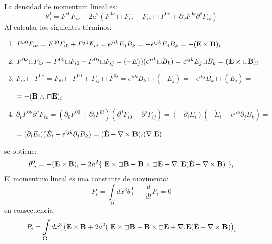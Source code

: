 \documentclass[a4paper,12pt]{article}
\begin{document}
La densidad de momentum lineal es:
\begin{equation}
\theta^0_{\ i}=F^{\nu0}F_{i\nu}-2a^2(F^{0\nu}\Box F_{i\nu}+F_{i\nu}\Box F^{0\nu}+\partial_\nu F^{0\nu}\partial^\rho F_{i\rho})
\end{equation}
Al calcular los siguientes términos:
\begin{enumerate}
 \item[\fbox{1.}]$F^{\nu0}F_{i\nu}=F^{00}F_{i0}+F^{j0}F_{ij}=\epsilon^{jik}E_jB_k=-\epsilon^{ijk}E_jB_k=-({\bf E}\times {\bf B})_{i}$ 
 \item[\fbox{2.}]$F^{0\nu}\Box F_{i\nu}=F^{00}\Box F_{i0}+F^{0j}\Box F_{ij}=(-E_j)(\epsilon^{jik}\Box B_k)=\epsilon^{ijk}E_j\Box B_k=({\bf E}\times\Box{\bf B})_{i}$
 \item[\fbox{3.}]$F_{i\nu}\Box F^{0\nu}=F_{i0}\Box F^{00}+F_{ij}\Box F^{0j}=\epsilon^{jik}B_k\Box(-E_j)
=-\epsilon^{ikj}B_k\Box(E_j)=$
\vspace{0,1cm}

$=-({\bf B}\times\Box{\bf E})_i$
 \item[\fbox{4.}]$\partial_\nu F^{0\nu}\partial^\rho F_{i\rho}=(\partial_0 F^{00}+\partial_i F^{0i})(\partial^0 F_{i0}+\partial^j F_{ij})=(-\partial_iE_i)(-\dot E_i-\epsilon^{jik}\partial_jB_k)=$
\vspace{0,2cm}

$=(\partial_iE_i)(\dot E_i-\epsilon^{ijk}\partial_jB_k)=(\dot{\bf E}-\nabla\times{\bf B})_{i}(\nabla.{\bf E})$
\end{enumerate}
se obtiene:
\begin{equation}
\theta^0_{\ i}=-({\bf E}\times{\bf B})_i-2a^2\{\ {\bf E}\times\Box{\bf B}-{\bf B}\times\Box{\bf E}+\nabla\ldotp {\bf E}(\dot{\bf E}-\nabla \times {\bf B})\ \}_{i}
\end{equation}
El momentum lineal es una constante de movimento:
\begin{equation}
 P_i=\int\limits_{\Omega}dx^{3}\theta^{0}_{\ i} \ \ \ \ \ \ \ \frac{d}{dt}P_i=0
\end{equation}
en consecuencia:
\begin{equation}
 P_i=\int\limits_{\Omega}dx^{3}\left({\bf E}\times{\bf B}+2a^2(\ {\bf E}\times\Box{\bf B}-{\bf B}\times\Box{\bf E}+\nabla.{\bf E}(\dot{\bf E}-\nabla\times{\bf B})\right) _{i} 
\end{equation}
\vspace{0,4cm}

\\
\end{document}
